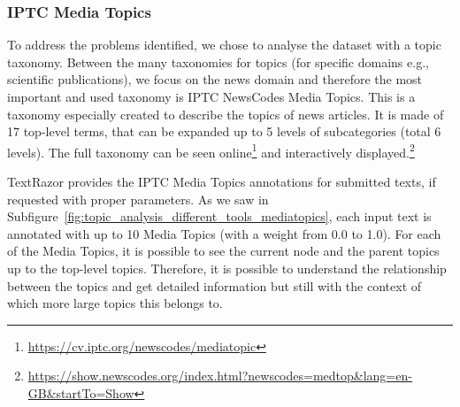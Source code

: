 



\subsubsection{\statusgreen IPTC Media Topics}

To address the problems identified, %
we chose to analyse the dataset with a topic taxonomy.
Between the many taxonomies for topics (for specific domains e.g., scientific publications\cite{vayansky2020review,churchill2022evolution}), we focus on the news domain and therefore the most important and used taxonomy is IPTC NewsCodes Media Topics.
This is a taxonomy especially created to describe the topics of news articles. It is made of 17 top-level terms, that can be expanded up to 5 levels of subcategories (total 6 levels).
The full taxonomy can be seen online\footnote{\url{https://cv.iptc.org/newscodes/mediatopic}} and interactively displayed.\footnote{\url{https://show.newscodes.org/index.html?newscodes=medtop&lang=en-GB&startTo=Show}}




TextRazor provides the IPTC Media Topics annotations for submitted texts, if requested with proper parameters.
As we saw in Subfigure~\ref{fig:topic_analysis_different_tools_mediatopics}, each input text is annotated with up to 10 Media Topics (with a weight from 0.0 to 1.0). For each of the Media Topics, it is possible to see the current node and the parent topics up to the top-level topics.
Therefore, it is possible to understand the relationship between the topics and get detailed information but still with the context of which more large topics this belongs to.


